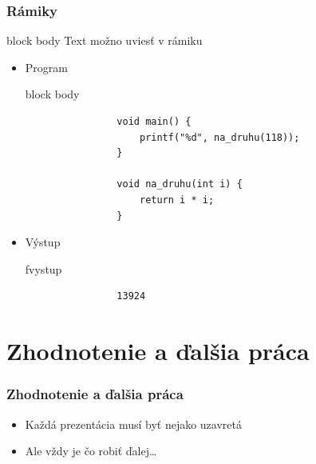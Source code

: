 \documentclass{beamer}
\newenvironment{program}{\begin{beamercolorbox}[rounded=true,shadow=true]{block body}\vspace{-4mm}}{\vspace{-2mm}\end{beamercolorbox}}
\newenvironment{vystup}{\begin{beamercolorbox}[rounded=true,shadow=true]{fvystup}}{\end{beamercolorbox}}
\newenvironment{poznamka}{\begin{beamercolorbox}[rounded=true,shadow=false]{block body}}{\end{beamercolorbox}}
\begin{document}
\begin{frame}[fragile=singleslide]\frametitle{Rámiky}
	\begin{poznamka}
		Text možno uviesť v rámiku
	\end{poznamka}
	
	\begin{itemize}
		\item Program
		
		\begin{program}
			\begin{lstlisting}
				void main() {
					printf("%d", na_druhu(118));
				}
				
				void na_druhu(int i) {
					return i * i;
				}
			\end{lstlisting}
		\end{program}
		
		\item Výstup
		\begin{vystup}
			\begin{lstlisting}
				13924
			\end{lstlisting}
		\end{vystup}
		
	\end{itemize}
\end{frame}



\section*{Zhodnotenie a ďalšia práca}

\begin{frame}[fragile=singleslide]\frametitle{Zhodnotenie a ďalšia práca}
	\begin{itemize}
		\item Každá prezentácia musí byť nejako uzavretá
		\item Ale vždy je čo robiť ďalej\ldots{}
	\end{itemize}
\end{frame}
\end{document}

